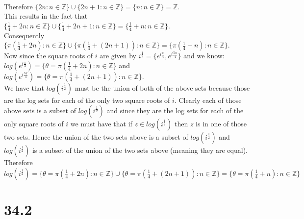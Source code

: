 \documentclass{article}
\begin{document}
\begin{center}
    \\Therefore $\{2n:n\in\mathbb{Z}\}\cup\{2n+1:n\in\mathbb{Z}\} =\{n:n\in\mathbb{Z}\} =\mathbb{Z}$.
    \\This results in the fact that $\{\frac{1}{4}+2n:n\in\mathbb{Z}\}\cup\{\frac{1}{4}+2n+1:n\in\mathbb{Z}\} =\{\frac{1}{4}+n:n\in\mathbb{Z}\}$.
    \\Consequently $\{\pi(\frac{1}{4}+2n):n\in\mathbb{Z}\}\cup\{\pi(\frac{1}{4}+(2n+1)):n\in\mathbb{Z}\} =\{\pi(\frac{1}{4}+n):n\in\mathbb{Z}\}$.
    \break
    \\Now since the square roots of $i$ are given by $i^{\frac{1}{2}} =\{e^{i\frac{\pi}{4}}, e^{i\frac{5\pi}{4}}\}$ and we know:
    \\$log(e^{i\frac{\pi}{4}}) =\{\theta =\pi(\frac{1}{4} + 2n):n\in\mathbb{Z}\}$ and $log(e^{i\frac{5\pi}{4}}) =\{\theta =\pi (\frac{1}{4} + (2n + 1)):n\in\mathbb{Z}\}$.
    \break
    \\We have that $log(i^{\frac{1}{2}})$ must be the union of both of the above sets because those are the log sets for each of the only two square roots of $i$. Clearly each of those above sets is a subset of $log(i^{\frac{1}{2}})$ and since they are the log sets for each of the only square roots of $i$ we must have that if $z\in log(i^{\frac{1}{2}})$ then $z$ is in one of those two sets. Hence the union of the two sets above is a subset of $log(i^{\frac{1}{2}})$ and $log(i^{\frac{1}{2}})$ is a subset of the union of the two sets above (meaning they are equal).
    \break
    \\Therefore $log(i^{\frac{1}{2}}) =\{\theta =\pi(\frac{1}{4} + 2n):n\in\mathbb{Z}\}\cup\{\theta =\pi (\frac{1}{4} + (2n + 1)):n\in\mathbb{Z}\} =\{\theta =\pi(\frac{1}{4}+n):n\in\mathbb{Z}\}$ \qedsymbol
\end{center}


\newpage
\section*{34.2}
\end{document}
